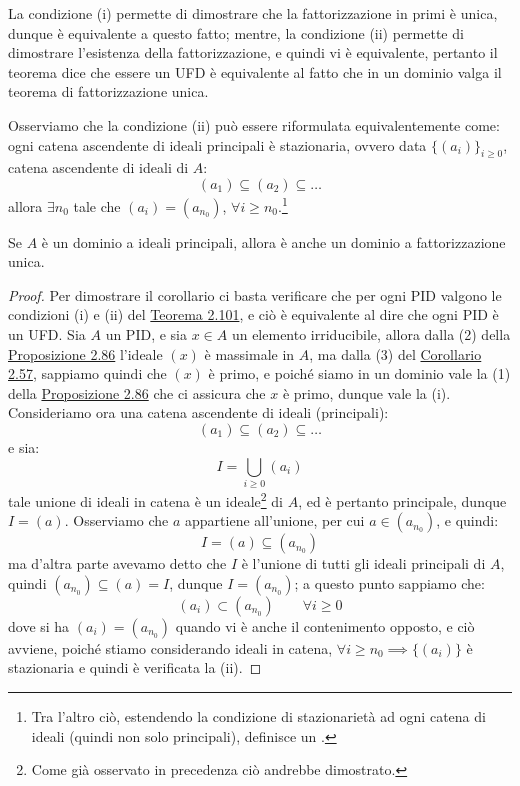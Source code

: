 \documentclass[11pt]{scrartcl}
\begin{document}
\begin{remark}
    La condizione (i) permette di dimostrare che la fattorizzazione in primi è unica, dunque è equivalente a questo fatto; mentre, la condizione (ii) 
    permette di dimostrare l'esistenza della fattorizzazione, e quindi vi è equivalente, pertanto il teorema dice che essere un UFD è equivalente al 
    fatto che in un dominio valga il teorema di fattorizzazione unica.
\end{remark}

\begin{remark}
    Osserviamo che la condizione (ii) può essere riformulata equivalentemente come: ogni catena ascendente di ideali principali è stazionaria, ovvero
    data $\{(a_i)\}_{i \geq 0}$, catena ascendente di ideali di $A$:
    \[ (a_1) \subseteq (a_2) \subseteq \ldots
        \]
    allora $\exists n_0$ tale che $(a_i) = (a_{n_0})$, $\forall i \geq n_0$.\footnote{Tra l'altro ciò, estendendo la condizione di stazionarietà ad ogni catena di ideali (quindi non solo principali), definisce un .}
\end{remark}

\begin{corollary}
    Se $A$ è un dominio a ideali principali, allora è anche un dominio a fattorizzazione unica.
\end{corollary}

\begin{proof}
    Per dimostrare il corollario ci basta verificare che per ogni PID valgono le condizioni (i) e (ii) del \hyperref[2.101]{Teorema 2.101}, e ciò è equivalente al dire che ogni PID è un UFD.
    Sia $A$ un PID, e sia $x \in A$ un elemento irriducibile, allora dalla (2) della \hyperref[2.86]{Proposizione 2.86} l'ideale $(x)$ è massimale in $A$, ma dalla (3) del \hyperref[2.57]{Corollario 2.57}, sappiamo quindi che 
    $(x)$ è primo, e poiché siamo in un dominio vale la (1) della \hyperref[2.86]{Proposizione 2.86} che ci assicura che $x$ è primo, dunque vale la (i).\\
    Consideriamo ora una catena ascendente di ideali (principali):
    \[ (a_1) \subseteq (a_2) \subseteq \ldots
        \]
    e sia:
    \[ I = \bigcup_{i \geq 0} (a_i)
        \]
    tale unione di ideali in catena è un ideale\footnote{Come già osservato in precedenza ciò andrebbe dimostrato.} di $A$, ed è pertanto principale, dunque $I = (a)$.
    Osserviamo che $a$ appartiene all'unione, per cui $a \in (a_{n_0})$, e quindi:
    \[ I = (a) \subseteq (a_{n_0})
        \]
    ma d'altra parte avevamo detto che $I$ è l'unione di tutti gli ideali principali di $A$, quindi $(a_{n_0}) \subseteq (a) = I $, dunque $I = (a_{n_0})$; a questo punto sappiamo che:
    \[ (a_i) \subset (a_{n_0}) \qquad \forall i \geq 0
        \]
    dove si ha $(a_i) = (a_{n_0})$ quando vi è anche il contenimento opposto, e ciò avviene, poiché stiamo considerando ideali in catena, $\forall i \geq n_0 \implies \{(a_i)\}$ è stazionaria e quindi è verificata la (ii).
\end{proof}
\end{document}
